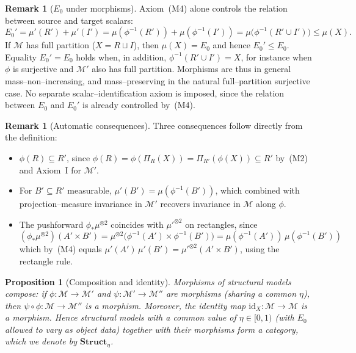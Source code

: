 \documentclass[11pt]{article}
\numberwithin{equation}{section}
\newtheorem{proposition}[theorem]{Proposition}
\theoremstyle{definition}
\newtheorem{remark}[theorem]{Remark}
\begin{document}
\begin{remark}[$E_0$ under morphisms]\label{rem:E0-morphism}
Axiom~(M4) alone controls the relation between source and target scalars:
\[
E_0'=\mu'(R')+\mu'(I')=\mu(\phi^{-1}(R'))+\mu(\phi^{-1}(I'))=\mu\big(\phi^{-1}(R'\cup I')\big)\le\mu(X).
\]
If $\mathcal M$ has full partition ($X=R\sqcup I$), then $\mu(X)=E_0$ and hence $E_0'\le E_0$. Equality $E_0'=E_0$ holds when, in addition, $\phi^{-1}(R'\cup I')=X$, for instance when $\phi$ is surjective and $\mathcal M'$ also has full partition. Morphisms are thus in general mass--non--increasing, and mass--preserving in the natural full--partition surjective case. No separate scalar--identification axiom is imposed, since the relation between $E_0$ and $E_0'$ is already controlled by~(M4).
\end{remark}

\begin{remark}[Automatic consequences]\label{rem:morphism-consequences}
Three consequences follow directly from the definition:
\begin{itemize}[nosep]
\item $\phi(R)\subseteq R'$, since $\phi(R)=\phi(\Pi_R(X))=\Pi_{R'}(\phi(X))\subseteq R'$ by~(M2) and Axiom~I for $\mathcal M'$.
\item For $B'\subseteq R'$ measurable, $\mu'(B')=\mu(\phi^{-1}(B'))$, which combined with projection--measure invariance in $\mathcal M'$ recovers invariance in $\mathcal M$ along $\phi$.
\item The pushforward $\phi_*\mu^{\otimes2}$ coincides with $\mu'^{\otimes2}$ on rectangles, since
\[
(\phi_*\mu^{\otimes2})(A'\times B')=\mu^{\otimes2}\bigl(\phi^{-1}(A')\times\phi^{-1}(B')\bigr)=\mu(\phi^{-1}(A'))\,\mu(\phi^{-1}(B'))
\]
which by~(M4) equals $\mu'(A')\,\mu'(B')=\mu'^{\otimes2}(A'\times B')$, using the rectangle rule.
\end{itemize}
\end{remark}

\begin{proposition}[Composition and identity]\label{prop:category}
Morphisms of structural models compose: if $\phi:\mathcal M\to\mathcal M'$ and $\psi:\mathcal M'\to\mathcal M''$ are morphisms (sharing a common $\eta$), then $\psi\circ\phi:\mathcal M\to\mathcal M''$ is a morphism. Moreover, the identity map $\mathrm{id}_X:\mathcal M\to\mathcal M$ is a morphism. Hence structural models with a common value of $\eta\in[0,1)$ (with $E_0$ allowed to vary as object data) together with their morphisms form a category, which we denote by $\mathbf{Struct}_{\eta}$.
\end{proposition}
\end{document}
